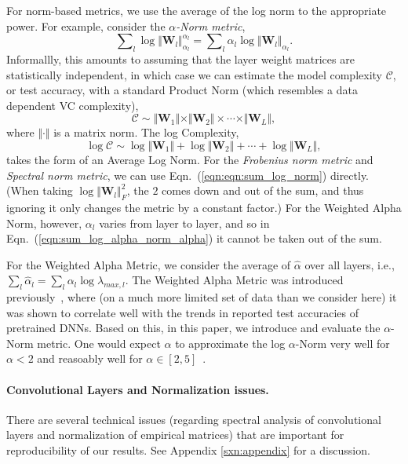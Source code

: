 For norm-based metrics, we use the average of the log norm to the appropriate power.
For example, consider the \emph{$\alpha$-Norm metric}, 
\begin{equation}
\label{eqn:sum_log_alpha_norm_alpha}
\sum\nolimits_l \log \Vert\mathbf{W}_l\Vert_{\alpha_l}^{\alpha_l} 
=
\sum\nolimits_l \alpha_l \log \Vert\mathbf{W}_l\Vert_{\alpha_l} .
\end{equation}
Informallly, this amounts to assuming that the layer weight matrices are statistically independent, in which case we can estimate the model complexity $\mathcal{C}$, or test accuracy, with a standard Product Norm (which resembles a data dependent VC complexity),
\begin{equation}
\mathcal{C}\sim\Vert\mathbf{W}_{1}\Vert\times\Vert\mathbf{W}_{2}\Vert \times \cdots \times \Vert\mathbf{W}_{L}\Vert ,
\end{equation}
where $\Vert\cdot\Vert$ is a matrix norm.   
The log Complexity,
\begin{equation}
\label{eqn:eqn:sum_log_norm}
\log\mathcal{C} \sim \log\Vert\mathbf{W}_{1}\Vert+\log\Vert\mathbf{W}_{2}\Vert + \cdots + \log\Vert\mathbf{W}_{L}\Vert  ,
\end{equation}
 takes the form of an Average Log Norm.
For the \emph{Frobenius norm metric} and \emph{Spectral norm metric}, we can use Eqn.~(\ref{eqn:eqn:sum_log_norm}) directly. 
(When taking $\log\Vert\mathbf{W}_{l}\Vert_{F}^{2}$, the $2$ comes down and out of the sum, and thus ignoring it only changes the metric by a constant factor.)
For the Weighted Alpha Norm, however, $\alpha_l$ varies from layer to layer, and so in Eqn.~(\ref{eqn:sum_log_alpha_norm_alpha}) it cannot be taken out of the sum.


For the Weighted Alpha Metric, we consider the average of $\hat{\alpha}$ over all layers, i.e., 
$ %
\sum_l \hat{\alpha}_l = \sum_l \alpha_l\log\lambda_{max,l}  .  
$ %
The Weighted Alpha Metric was introduced previously~\cite{MM20_SDM}, where (on a much more limited set of data than we consider here) it was shown to correlate well with the trends in reported test accuracies of pretrained DNNs.
Based on this, in this paper, we introduce and evaluate the $\alpha$-Norm metric.
One would expect $\hat{\alpha}$ to approximate the log $\alpha$-Norm very well for $\alpha < 2$ and reasoably well for $\alpha\in[2,5]$~\cite{MM20_unpub_work}.




\paragraph{Convolutional Layers and Normalization issues.}
There are several technical issues (regarding spectral analysis of convolutional layers and normalization of empirical matrices) that are important for reproducibility of our results.
See Appendix \ref{sxn:appendix} for a discussion.


